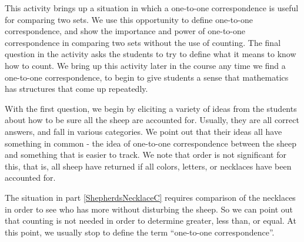 \documentclass[nooutcomes]{ximera}
\begin{document}
\newpage
\begin{instructorNotes}

This activity brings up a situation in which a one-to-one correspondence is useful for comparing two sets.  We use this opportunity to define one-to-one correspondence, and show the importance and power of one-to-one correspondence in comparing two sets without the use of counting.  
The final question in the activity asks the students to try to define what it means to know how to count. We bring up this activity later in the course any time we find a one-to-one correspondence, to begin to give students a sense that mathematics has structures that come up repeatedly.


With the first question, we begin by eliciting a variety of ideas from the students about how to be sure all the sheep are accounted for.  Usually, they are all correct answers, and fall in various categories.  We point out that their ideas all have something in common - the idea of one-to-one correspondence between the sheep and something that is easier to track.  We note that order is not significant for this, that is, all sheep have returned if all colors, letters, or necklaces have been accounted for.


The situation in part \ref{ShepherdsNecklaceC} requires comparison of the necklaces in order to see who has more without disturbing the sheep.  So we can point out that counting is not needed in order to determine greater, less than, or equal. At this point, we usually stop to define the term ``one-to-one correspondence''.




\end{instructorNotes}
\end{document}

